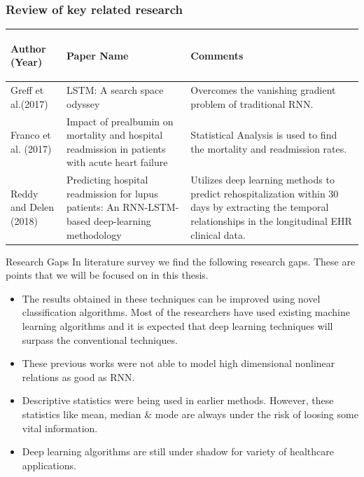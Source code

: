 \documentclass{beamer}
\begin{document}
\begin{frame}\frametitle{Review of key related research}
\begin{tabular}{ | p{1.5cm} | p{3.8cm} | p{5cm}| } 

\hline 
{\bf \begin{center} \footnotesize{Author (Year)} \end{center}} & {\bf \begin{center} \footnotesize{Paper Name} \end{center}} & {\bf \begin{center} \footnotesize{Comments} \end{center}} \\
\hline
\footnotesize{Greff et al.(2017)} & \footnotesize{LSTM: A search space odyssey} & \footnotesize{Overcomes the vanishing gradient problem of traditional RNN.}\\


\hline
\footnotesize{Franco et al. (2017)} & \footnotesize{Impact of prealbumin on mortality and hospital readmission in patients with acute heart failure} & \footnotesize{Statistical Analysis is used to find the mortality and readmission rates.} \\ 
\hline
\footnotesize{Reddy and Delen (2018)} & \footnotesize{Predicting hospital readmission for lupus patients: An RNN-LSTM-based deep-learning methodology} & \footnotesize{ Utilizes deep learning methods to predict rehospitalization within 30 days by extracting the temporal relationships in the longitudinal EHR clinical data.}\\
\hline

\end{tabular}
\end{frame}



\begin{frame}{Research Gaps}
    In literature survey we find the following research gaps. These are points that we will
be focused on in this thesis.
    \begin{itemize}
        \item The results obtained in these techniques can be improved using novel classification algorithms. Most of the researchers have used existing machine learning algorithms and it is expected that deep learning techniques will surpass the conventional techniques.
        \item These previous works were not able to model high dimensional nonlinear relations as good as RNN.
        \item Descriptive statistics were being used in earlier methods. However, these statistics like mean, median & mode are always under the risk of loosing some vital
        information.
        \item Deep learning algorithms are still under shadow for variety of healthcare applications.
    \end{itemize}
\end{frame}
\end{document}
